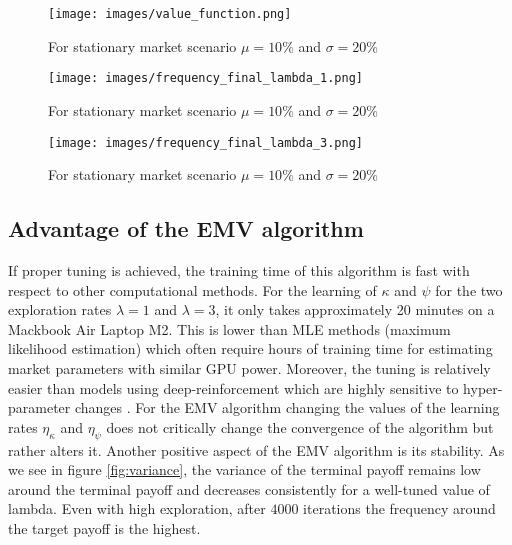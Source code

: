 \documentclass[oneside, a4paper, onecolumn, 11pt]{article}
\begin{document}
\begin{figure}[ht] %
    \centering
    \texttt{[image: images/value\_function.png]} %
    \caption{For stationary market scenario $\mu=10\%$ and $\sigma = 20\%$}
    \label{fig:value_function}
\end{figure} 
\begin{figure}[ht] %
    \centering
    \texttt{[image: images/frequency\_final\_lambda\_1.png]} %
    \caption{For stationary market scenario $\mu=10\%$ and $\sigma = 20\%$}
    \label{fig:frequency_final_payoff_lambda_1}
\end{figure}
\begin{figure}[ht] %
    \centering
    \texttt{[image: images/frequency\_final\_lambda\_3.png]} %
    \caption{For stationary market scenario $\mu=10\%$ and $\sigma = 20\%$}
    \label{fig:Mean_final_lambda_3}
\end{figure}  
\clearpage
\subsection{Advantage of the EMV algorithm} 
If proper tuning is achieved, the training time of this algorithm is fast with respect to other computational methods. For the learning of $\kappa$ and $\psi$ for the two exploration rates $ \lambda = 1$ and $\lambda = 3$, it only takes approximately 20 minutes on a Mackbook Air Laptop M2. This is lower than MLE methods (maximum likelihood estimation) which often require hours of training time for estimating market parameters \cite{WangZhou2020} with similar GPU power.
Moreover, the tuning is relatively easier than models using deep-reinforcement which are highly sensitive to hyper-parameter changes \cite{DuanY2016}. For the EMV algorithm changing the values of the learning rates $\eta_{\kappa}$ and $\eta_{\psi}$ does not critically change the convergence of the algorithm but rather alters it. 
Another positive aspect of the EMV algorithm is its stability. As we see in figure \eqref{fig:variance}, the variance of the terminal payoff remains low around the terminal payoff and decreases consistently for a well-tuned value of lambda. 
Even with high exploration, after $4000$ iterations the frequency around the target payoff is the highest. 
\end{document}
